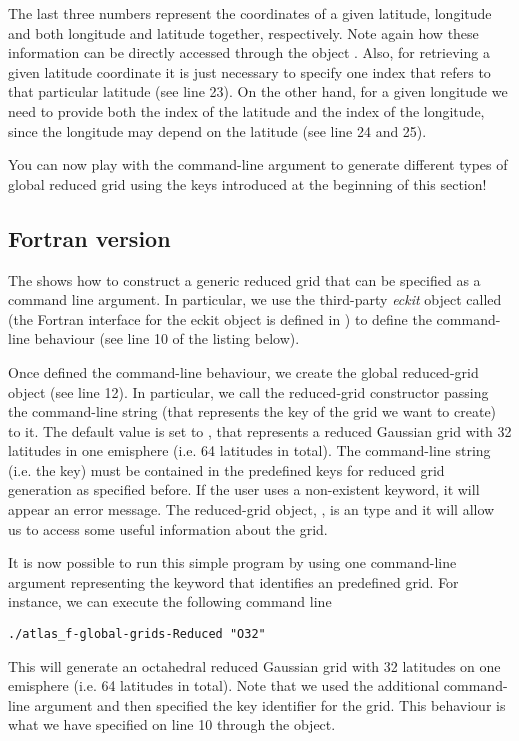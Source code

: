 The last three numbers represent the coordinates of a given 
latitude, longitude and both longitude and latitude together, 
respectively. Note again how these information can be directly 
accessed through the object . 
Also, for retrieving a given latitude coordinate it is just 
necessary to specify one index that refers to that particular 
latitude (see line 23). On the other hand, for a given longitude 
we need to provide both the index of the latitude and the index 
of the longitude, since the longitude may depend on the latitude 
(see line 24 and 25).

You can now play with the command-line argument to generate 
different types of global reduced grid using the keys introduced 
at the beginning of this section!

\subsection{Fortran version}
The  shows how to construct a generic 
reduced grid that can be specified as a command line 
argument. In particular, we use the third-party \textit{eckit} 
object called  (the Fortran interface 
for the eckit  object is defined in \Atlas) 
to define the command-line behaviour (see line 10 of the 
listing below). 

%

%

Once defined the command-line behaviour, we create the global 
reduced-grid object (see line 12). In particular, we call 
the reduced-grid constructor passing the command-line string 
(that represents the key of the grid we want to create) to 
it. The default value is set to , that represents 
a reduced Gaussian grid with 32 latitudes in one emisphere 
(i.e. 64 latitudes in total).  
The command-line string (i.e. the key) must be contained 
in the predefined keys for reduced grid generation as specified 
before. If the user uses a non-existent keyword, it will 
appear an error message.
The reduced-grid object, , is 
an  type and it will allow 
us to access some useful information about the grid.  

It is now possible to run this simple program by using 
one command-line argument representing the keyword that 
identifies an \Atlas predefined grid. For instance, we 
can execute the following command line 
%
\begin{lstlisting}[style=BashStyle]
./atlas_f-global-grids-Reduced "O32"
\end{lstlisting}
% 
This will generate an octahedral reduced Gaussian grid 
with 32 latitudes on one emisphere (i.e. 64 latitudes 
in total).
Note that we used the additional command-line argument 
 and then specified the key identifier 
for the grid. This behaviour is what we have specified 
on line 10 through the  object.

